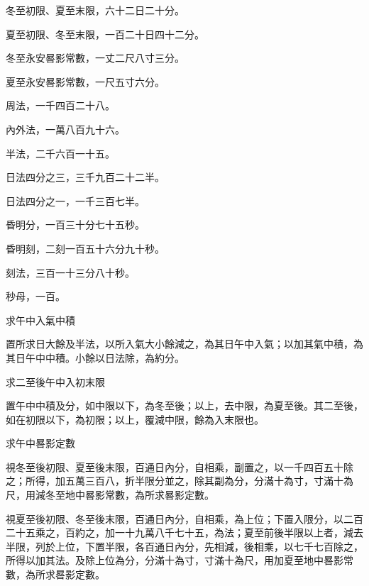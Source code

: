 \begin{pinyinscope}
 冬至初限、夏至末限，六十二日二十分。



 夏至初限、冬至末限，一百二十日四十二分。



 冬至永安晷影常數，一丈二尺八寸三分。



 夏至永安晷影常數，一尺五寸六分。



 周法，一千四百二十八。



 內外法，一萬八百九十六。



 半法，二千六百一十五。



 日法四分之三，三千九百二十二半。



 日法四分之一，一千三百七半。



 昏明分，一百三十分七十五秒。



 昏明刻，二刻一百五十六分九十秒。



 刻法，三百一十三分八十秒。



 秒母，一百。



 求午中入氣中積



 置所求日大餘及半法，以所入氣大小餘減之，為其日午中入氣；以加其氣中積，為其日午中中積。小餘以日法除，為約分。



 求二至後午中入初末限



 置午中中積及分，如中限以下，為冬至後；以上，去中限，為夏至後。其二至後，如在初限以下，為初限；以上，覆減中限，餘為入末限也。



 求午中晷影定數



 視冬至後初限、夏至後末限，百通日內分，自相乘，副置之，以一千四百五十除之；所得，加五萬三百八，折半限分並之，除其副為分，分滿十為寸，寸滿十為尺，用減冬至地中晷影常數，為所求晷影定數。



 視夏至後初限、冬至後末限，百通日內分，自相乘，為上位；下置入限分，以二百二十五乘之，百約之，加一十九萬八千七十五，為法；夏至前後半限以上者，減去半限，列於上位，下置半限，各百通日內分，先相減，後相乘，以七千七百除之，所得以加其法。及除上位為分，分滿十為寸，寸滿十為尺，用加夏至地中晷影常數，為所求晷影定數。




\end{pinyinscope}
